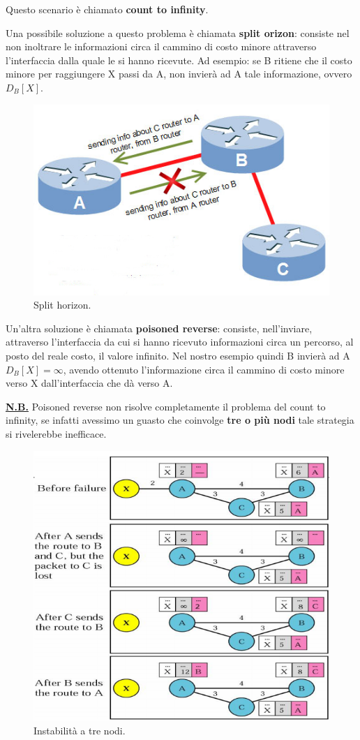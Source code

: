 \documentclass[11pt,a4paper,oneside]{book}
\theoremstyle{definition}
\begin{document}
Questo scenario è chiamato \textbf{count to infinity}.

Una possibile soluzione a questo problema è chiamata \textbf{split orizon}: consiste nel non inoltrare le informazioni circa il cammino di costo minore attraverso l'interfaccia dalla quale le si hanno ricevute. Ad esempio: se B ritiene che il costo minore per raggiungere X passi da A, non invierà ad A tale informazione, ovvero $D_{B}[X]$.

\begin{figure}[!h]
	\centering
	\includegraphics[scale=0.5]{Immagini/split-horizon.jpg}
	\caption{Split horizon.}
\end{figure}

\pagebreak

Un'altra soluzione è chiamata \textbf{poisoned reverse}: consiste, nell'inviare, attraverso l'interfaccia da cui si hanno ricevuto informazioni circa un percorso, al posto del reale costo, il valore infinito. Nel nostro esempio quindi B invierà ad A $D_{B}[X] = \infty$, avendo ottenuto l'informazione circa il cammino di costo minore verso X dall'interfaccia che dà verso A. 

\textbf{\underline{N.B.}} Poisoned reverse non risolve completamente il problema del count to infinity, se infatti avessimo un guasto che coinvolge \textbf{tre o più nodi} tale strategia si rivelerebbe inefficace.

\begin{figure}[!h]
	\centering
	\includegraphics[scale=0.4]{Immagini/Three_nodes.png}
	\caption{Instabilità a tre nodi.}
\end{figure}
\end{document}
